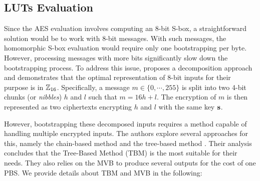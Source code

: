 \subsection{LUTs Evaluation}
\label{sec:primitives_hyppogriph}
Since the \gls{AES} evaluation involves computing an 8-bit \gls{S-box}, a straightforward solution would be to work with 8-bit messages. With such messages, the homomorphic \gls{S-box} evaluation would require only one bootstrapping per byte. However, processing messages with more bits significantly slow down the bootstrapping process. To address this issue, \cite{DBLP:conf/wahc/TramaCBS23} proposes a decomposition approach and demonstrates that the optimal representation of 8-bit inputs for their purpose is in $\mathbb{Z}_{16}$. Specifically, a message $m \in \{0, \cdots, 255\}$ is split into two 4-bit chunks (or \emph{nibbles}) $h$ and $l$ such that $m = 16h+l$. The encryption of $m$ is then represented as two ciphertexts encrypting $h$ and $l$ with the same key $\mathbf s$.

However, bootstrapping these decomposed inputs requires a method capable of handling multiple encrypted inputs. The authors explore several approaches for this, namely the chain-based method and the tree-based method \cite{TCHES:GuiBorAra21}. Their analysis concludes that the Tree-Based Method (\gls{TBM}) is the most suitable for their needs. They also relies on the \gls{MVB} to produce several outputs for the cost of one \gls{PBS}. We provide details about \gls{TBM} and \gls{MVB} in the following:

